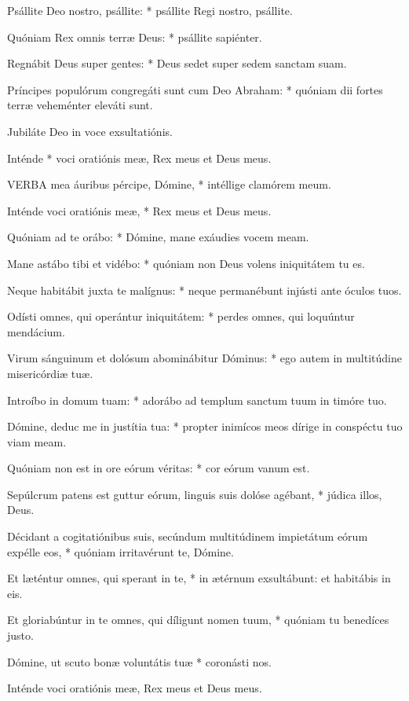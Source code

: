 Psállite Deo nostro, psállite: * psállite Regi nostro, psállite.

Quóniam Rex omnis terræ Deus: * psállite sapiénter.

Regnábit Deus super gentes: * Deus sedet super sedem sanctam suam.

Príncipes populórum congregáti sunt cum Deo Abraham: * quóniam dii fortes terræ veheménter eleváti sunt.

 Jubiláte Deo in voce exsultatiónis.

 Inténde * voci oratiónis meæ, Rex meus et Deus meus.


\lettrine[lines=2]{V}{ERBA} mea áuribus pércipe, Dómine, * intéllige clamórem meum.

Inténde voci oratiónis meæ, * Rex meus et Deus meus.

Quóniam ad te orábo: * Dómine, mane exáudies vocem meam.

Mane astábo tibi et vidébo: * quóniam non Deus volens iniquitátem tu es.

Neque habitábit juxta te malígnus: * neque permanébunt injústi ante óculos tuos.

Odísti omnes, qui operántur iniquitátem: * perdes omnes, qui loquúntur mendácium.

Virum sánguinum et dolósum abominábitur Dóminus: * ego autem in multitúdine misericórdiæ tuæ.

Introíbo in domum tuam: * adorábo ad templum sanctum tuum in timóre tuo.

Dómine, deduc me in justítia tua: * propter inimícos meos dírige in conspéctu tuo viam meam.

Quóniam non est in ore eórum véritas: * cor eórum vanum est.

Sepúlcrum patens est guttur eórum, linguis suis dolóse agébant, * júdica illos, Deus.

Décidant a cogitatiónibus suis, secúndum multitúdinem impietátum eórum expélle eos, * quóniam irritavérunt te, Dómine.

Et læténtur omnes, qui sperant in te, * in ætérnum exsultábunt: et habitábis in eis.

Et gloriabúntur in te omnes, qui díligunt nomen tuum, * quóniam tu benedíces justo.

Dómine, ut scuto bonæ voluntátis tuæ * coronásti nos.

 Inténde voci oratiónis meæ, Rex meus et Deus meus.

